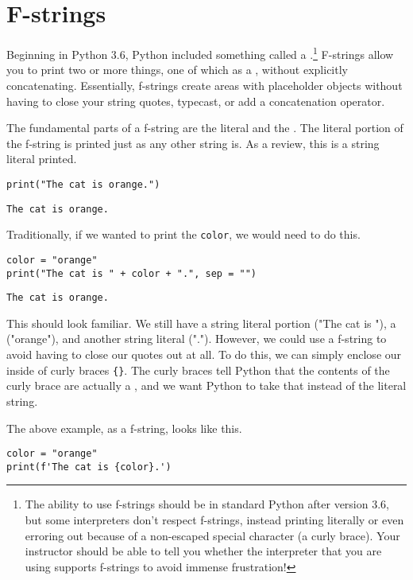 \section{F-strings}
Beginning in Python 3.6, Python included something called a .\footnote{The ability to use f-strings should be in standard Python after version 3.6, but some interpreters don't respect f-strings, instead printing literally or even erroring out because of a non-escaped special character (a curly brace). Your instructor should be able to tell you whether the interpreter that you are using supports f-strings to avoid immense frustration!} F-strings allow you to print two or more things, one of which as a , without explicitly concatenating. Essentially, f-strings create areas with placeholder objects without having to close your string quotes, typecast, or add a concatenation operator.\par
The fundamental parts of a f-string are the literal and the . The literal portion of the f-string is printed just as any other string is. As a review, this is a string literal printed.
\begin{lstlisting}[style=pippython]
print("The cat is orange.")
\end{lstlisting}
\begin{lstlisting}[style=none]
The cat is orange.
\end{lstlisting}
Traditionally, if we wanted to print the  \verb|color|, we would need to do this.
\begin{lstlisting}[style=pippython]
color = "orange"
print("The cat is " + color + ".", sep = "")
\end{lstlisting}
\begin{lstlisting}
The cat is orange.
\end{lstlisting}
This should look familiar. We still have a string literal portion ("The cat is "), a  ("orange"), and another string literal ("."). However, we could use a f-string to avoid having to close our quotes out at all. To do this, we can simply enclose our  inside of curly braces \verb|{}|. The curly braces tell Python that the contents of the curly brace are actually a , and we want Python to take that  instead of the literal string.\par
The above example, as a f-string, looks like this.
\begin{lstlisting}[style=pippython]
color = "orange"
print(f'The cat is {color}.')
\end{lstlisting}

